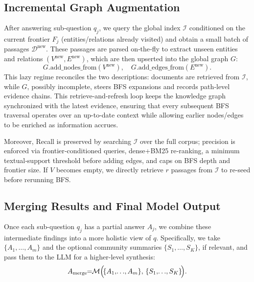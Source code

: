 \documentclass[runningheads]{llncs}
\begin{document}
\subsection{Incremental Graph Augmentation}
\label{sec:inc_graph}


After answering sub‑question \(q_j\), we query the global index \(\mathcal{I}\) conditioned on the current frontier \(F_j\) (entities/relations already visited) and obtain a small batch of passages \(\mathcal{D}^{\text{new}}\).
These passages are parsed on‑the‑fly to extract unseen entities and relations \((V^{\text{new}},E^{\text{new}})\), which are then upserted into the global graph \(G\):
\[
  G.\text{add\_nodes\_from}(V^{\text{new}}), \quad
  G.\text{add\_edges\_from}(E^{\text{new}}).
\]
This lazy regime reconciles the two descriptions: documents are retrieved from \(\mathcal{I}\), while \(G\), possibly incomplete, steers BFS expansions and records path‑level evidence chains.
This retrieve-and-refresh loop keeps the knowledge graph synchronized with the latest evidence, ensuring that every subsequent BFS traversal operates over an up-to-date context while allowing earlier nodes/edges to be enriched as information accrues.

Moreover, Recall is preserved by searching \(\mathcal{I}\) over the full corpus; precision is enforced via frontier‑conditioned queries, dense+BM25 re‑ranking, a minimum textual‑support threshold before adding edges, and caps on BFS depth and frontier size. If \(V\) becomes empty, we directly retrieve \(r\) passages from \(\mathcal{I}\) to re-seed before rerunning BFS.

\subsection{Merging Results and Final Model Output}
Once each sub-question $q_j$ has a partial answer $A_j$, we combine these intermediate findings into 
a more holistic view of $q$. Specifically, we take $\{A_1,\ldots,A_m\}$ and the optional community 
summaries $\{S_1,\ldots, S_K\}$, if relevant, and pass them to the LLM for a higher-level synthesis:
\begin{equation}
A_{\mathrm{merge}}\!\! =\!\! \mathcal{M}\Bigl(\!\{A_1,\!\ldots\!,A_m\},\,\{S_1,\!\ldots\!,S_K\}\!\Bigr).
\end{equation}
\end{document}
